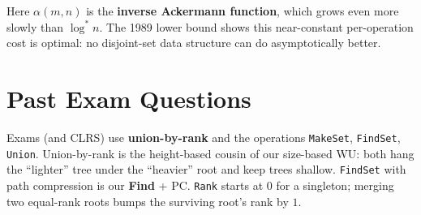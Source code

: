 \documentclass[11pt]{article}
\begin{document}
Here $\alpha(m,n)$ is the \textbf{inverse Ackermann function}, which grows even more slowly than $\log^* n$. The 1989 lower bound shows this near-constant per-operation cost is \textcolor{rustW}{optimal}: no disjoint-set data structure can do asymptotically better.

\section{Past Exam Questions}

\begin{warnbox}
Exams (and CLRS) use \textbf{union-by-rank} and the operations \texttt{MakeSet}, \texttt{FindSet}, \texttt{Union}. Union-by-rank is the height-based cousin of our size-based WU: both hang the ``lighter'' tree under the ``heavier'' root and keep trees shallow. \texttt{FindSet} with path compression is our \textbf{Find} + PC. \texttt{Rank} starts at $0$ for a singleton; merging two equal-rank roots bumps the surviving root's rank by $1$.
\end{warnbox}
\end{document}
